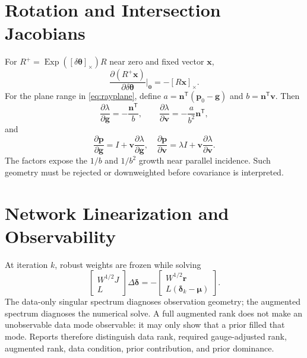 \documentclass[journal]{IEEEtran}
\newcommand{\T}{^{\mathsf T}}
\newcommand{\skewm}[1]{\left[#1\right]_{\times}}
\newcommand{\Exp}{\operatorname{Exp}}
\begin{document}
\appendices

\section{Rotation and Intersection Jacobians}

For $R^+=\Exp(\skewm{\delta\bm\theta})R$ near zero and fixed vector $\bm x$,
\begin{equation}
\frac{\partial(R^+\bm x)}{\partial\delta\bm\theta}\bigg|_{\bm0}
=-\skewm{R\bm x}.
\label{eq:rotjac}
\end{equation}
For the plane range in \eqref{eq:rayplane}, define
$a=\bm n\T(\bm p_0-\bm g)$ and $b=\bm n\T\bm v$. Then
\begin{equation}
\frac{\partial\lambda}{\partial\bm g}=-\frac{\bm n\T}{b},\qquad
\frac{\partial\lambda}{\partial\bm v}=-\frac{a}{b^2}\bm n\T,
\label{eq:rangejac}
\end{equation}
and
\begin{equation}
\frac{\partial\bm p}{\partial\bm g}=I+
\bm v\frac{\partial\lambda}{\partial\bm g},\quad
\frac{\partial\bm p}{\partial\bm v}=\lambda I+
\bm v\frac{\partial\lambda}{\partial\bm v}.
\label{eq:pointjac}
\end{equation}
The factors expose the $1/b$ and $1/b^2$ growth near parallel incidence. Such
geometry must be rejected or downweighted before covariance is interpreted.

\section{Network Linearization and Observability}

At iteration $k$, robust weights are frozen while solving
\begin{equation}
\begin{bmatrix}W^{1/2}J\\L\end{bmatrix}\Delta\bm\delta
=-\begin{bmatrix}W^{1/2}\bm r\\L(\bm\delta_k-\bm\mu)\end{bmatrix}.
\label{eq:augmented}
\end{equation}
The data-only singular spectrum diagnoses observation geometry; the augmented
spectrum diagnoses the numerical solve. A full augmented rank does not make an
unobservable data mode observable: it may only show that a prior filled that
mode. Reports therefore distinguish data rank, required gauge-adjusted rank,
augmented rank, data condition, prior contribution, and prior dominance.
\end{document}
